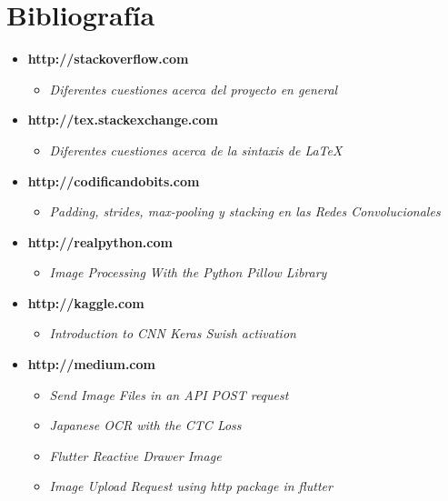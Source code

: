 \documentclass{article}
\begin{document}
\section{Bibliografía}
\label{sec:bib}
\begin{spacing}{0.05}
\begin{small}
    
    \begin{itemize}

        \item \textbf{http://stackoverflow.com}
            \begin{itemize}
                \item \textit{Diferentes cuestiones acerca del proyecto en general}
            \end{itemize}

        \item \textbf{http://tex.stackexchange.com}
            \begin{itemize}
                \item \textit{Diferentes cuestiones acerca de la sintaxis de LaTeX}
            \end{itemize}

        \item \textbf{http://codificandobits.com}
            \begin{itemize}
                \item \textit{Padding, strides, max-pooling y stacking en las Redes Convolucionales}
            \end{itemize}

        \item \textbf{http://realpython.com}
            \begin{itemize}
                \item \textit{Image Processing With the Python Pillow Library}
            \end{itemize}

        \item \textbf{http://kaggle.com}
            \begin{itemize}
                \item \textit{Introduction to CNN Keras Swish activation}
            \end{itemize}

        \item \textbf{http://medium.com}
            \begin{itemize}
                \item \textit{Send Image Files in an API POST request}
                \item \textit{Japanese OCR with the CTC Loss}
                \item \textit{Flutter Reactive Drawer Image}
                \item \textit{Image Upload Request using http package in flutter}
            \end{itemize}


\end{itemize}
\end{small}
\end{spacing}
\end{document}
